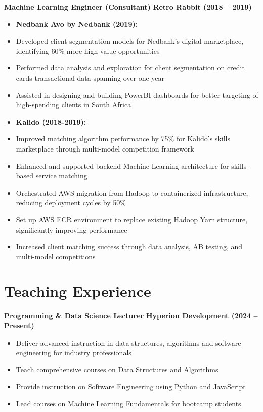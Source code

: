 \documentclass[a4paper,10pt]{article}
\begin{document}
\textbf{Machine Learning Engineer (Consultant)} \hfill \textbf{Retro Rabbit (2018 – 2019)}
\begin{itemize}[noitemsep,topsep=0pt]
    \item \textbf{Nedbank Avo by Nedbank (2019):}
    \item Developed client segmentation models for Nedbank's digital marketplace, identifying 60\% more high-value opportunities
    \item Performed data analysis and exploration for client segmentation on credit cards transactional data spanning over one year
    \item Assisted in designing and building PowerBI dashboards for better targeting of high-spending clients in South Africa
    
    \item \textbf{Kalido (2018-2019):}
    \item Improved matching algorithm performance by 75\% for Kalido's skills marketplace through multi-model competition framework
    \item Enhanced and supported backend Machine Learning architecture for skills-based service matching
    \item Orchestrated AWS migration from Hadoop to containerized infrastructure, reducing deployment cycles by 50\%
    \item Set up AWS ECR environment to replace existing Hadoop Yarn structure, significantly improving performance
    \item Increased client matching success through data analysis, AB testing, and multi-model competitions
\end{itemize}

\section{Teaching Experience}
\textbf{Programming \& Data Science Lecturer} \hfill \textbf{Hyperion Development (2024 – Present)}
\begin{itemize}[noitemsep,topsep=0pt]
    \item Deliver advanced instruction in data structures, algorithms and software engineering for industry professionals
    \item Teach comprehensive courses on Data Structures and Algorithms
    \item Provide instruction on Software Engineering using Python and JavaScript
    \item Lead courses on Machine Learning Fundamentals for bootcamp students
\end{itemize}
\end{document}
